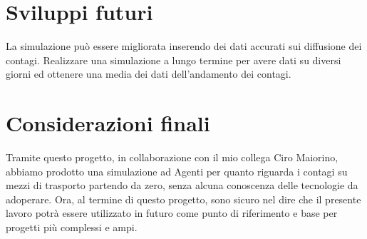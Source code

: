 \documentclass[12pt, openany]{book}
\begin{document}
	\section{Sviluppi futuri}
	La simulazione può essere migliorata  inserendo dei dati accurati sui diffusione dei contagi. Realizzare una simulazione a lungo termine per avere dati su diversi giorni ed ottenere una media dei dati dell'andamento dei contagi.
	\section{Considerazioni finali}
	Tramite questo progetto, in collaborazione con il mio collega Ciro Maiorino, abbiamo prodotto una simulazione ad Agenti per quanto riguarda i contagi su mezzi di trasporto partendo da zero, senza alcuna conoscenza delle tecnologie da adoperare. Ora, al termine di questo progetto, sono sicuro nel dire che il presente lavoro potrà essere utilizzato in futuro come punto di riferimento e base per progetti più complessi e ampi.


\end{document}
